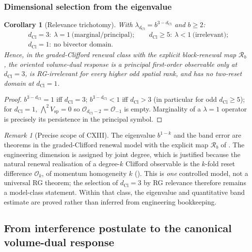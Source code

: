 \documentclass[11pt]{article}
\newtheorem{corollary}[theorem]{Corollary}
\theoremstyle{definition}
\theoremstyle{remark}
\newtheorem{remark}[theorem]{Remark}
\newcommand{\dCl}{d_{\mathrm{Cl}}}
\newcommand{\Vsp}{V_{\mathrm{sp}}}
\newcommand{\Ocal}{\mathcal{O}}
\newcommand{\Rb}{\mathscr{R}_b}
\begin{document}
\subsubsection{Dimensional selection from the eigenvalue}

\begin{corollary}[Relevance trichotomy]
\label{cor:relevance}
\textup{} With $\lambda_{\dCl}=b^{3-\dCl}$ and $b\ge2$:
\[
  \begin{aligned}
  &\dCl=3:\ \lambda=1\ \text{(marginal/principal)};\qquad
   \dCl\ge5:\ \lambda<1\ \text{(irrelevant)};\\
  &\dCl=1:\ \text{no bivector domain}.
  \end{aligned}
\]
Hence, in the graded-Clifford renewal class with the explicit block-renewal map
$\Rb$, the oriented volume-dual response is a principal first-order observable
only at $\dCl=3$, is RG-irrelevant for every higher odd spatial rank, and has no
two-reset domain at $\dCl=1$.
\end{corollary}

\begin{proof}
$b^{3-\dCl}=1$ iff $\dCl=3$; $b^{3-\dCl}<1$ iff $\dCl>3$ (in particular for odd
$\dCl\ge5$); for $\dCl=1$, $\bigwedge^2\Vsp=0$ so $\Ocal_{\dCl-2}=\Ocal_{-1}$ is
empty.  Marginality of a $\lambda=1$ operator is precisely its persistence in the
principal symbol.
\end{proof}

\begin{remark}[Precise scope of CXIII]
\label{rem:cxiii-status}
The eigenvalue $b^{1-k}$ and the band error are theorems in the
graded-Clifford renewal model with the explicit map $\Rb$ of
.  The engineering dimension is assigned by joint degree,
which is justified because the natural renewal realisation of a degree-$k$
Clifford observable is the $k$-fold reset difference $\Ocal_k$, of momentum
homogeneity $k$ ().  \textup{} This is
\emph{one} controlled model, not a universal RG theorem; the selection of $\dCl=3$
by RG relevance therefore remains a model-class statement.  Within that
class, the eigenvalue and quantitative band estimate are proved rather than
inferred from engineering bookkeeping.
\end{remark}



\subsection{From interference postulate to the canonical volume-dual response}
\label{subsec:interference-closure}
\end{document}
